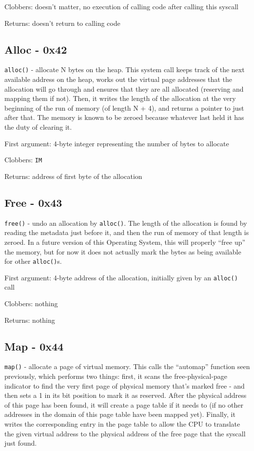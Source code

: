 \documentclass[12pt,a4paper]{report}
\begin{document}
Clobbers: doesn't matter, no execution of calling code after calling this syscall

Returns: doesn't return to calling code

\subsection*{Alloc - 0x42}
\texttt{alloc()} - allocate N bytes on the heap. This system call keeps track of the next available address on the heap, works out the virtual page addresses that the allocation will go through and ensures that they are all allocated (reserving and mapping them if not). Then, it writes the length of the allocation at the very beginning of the run of memory (of length N + 4), and returns a pointer to just after that. The memory is known to be zeroed because whatever last held it has the duty of clearing it.

First argument: 4-byte integer representing the number of bytes to allocate

Clobbers: \texttt{IM}

Returns: address of first byte of the allocation

\subsection*{Free - 0x43}
\texttt{free()} - undo an allocation by \texttt{alloc()}. The length of the allocation is found by reading the metadata just before it, and then the run of memory of that length is zeroed. In a future version of this Operating System, this will properly ``free up'' the memory, but for now it does not actually mark the bytes as being available for other \texttt{alloc()}s.

First argument: 4-byte address of the allocation, initially given by an \texttt{alloc()} call

Clobbers: nothing

Returns: nothing

\subsection*{Map - 0x44}
\texttt{map()} - allocate a page of virtual memory. This calls the ``automap'' function seen previously, which performs two things: first, it scans the free-physical-page indicator to find the very first page of physical memory that's marked free - and then sets a 1 in its bit position to mark it as reserved. After the physical address of this page has been found, it will create a page table if it needs to (if no other addresses in the domain of this page table have been mapped yet). Finally, it writes the corresponding entry in the page table to allow the CPU to translate the given virtual address to the physical address of the free page that the syscall just found.
\end{document}
